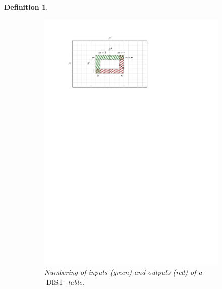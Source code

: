 \documentclass[twoside,11pt,openright]{report}
\newcommand{\DIST}{\operatorname{DIST}}
\newtheorem{mydef}{Definition}
\begin{document}
\begin{mydef}
  \begin{figure}[h!]
    \centering
    \begin{subfigure}{0.45\textwidth}
      \includegraphics[width=\textwidth]{images/grid-dist}
      \caption{Numbering of inputs (green) and outputs (red) of a $\DIST$-table.}
    \end{subfigure}
    \begin{subfigure}{0.45\textwidth}

\end{subfigure}
\end{figure}
\end{mydef}
\end{document}
